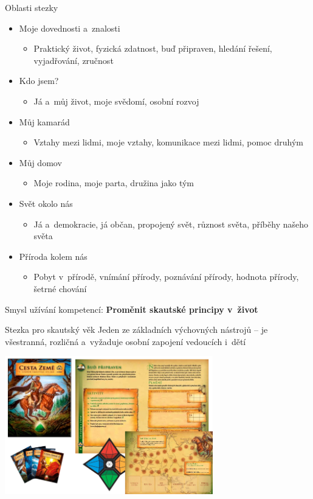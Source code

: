 \documentclass[compress,xelatex,xcolor=dvipsnames,print]{beamer}
\begin{document}
\begin{frame}{Oblasti stezky}
\begin{itemize}
\item Moje dovednosti a~znalosti
 \begin{itemize}
 \item Praktický život, fyzická zdatnost, buď připraven, hledání řešení, vyjadřování, zručnost
 \end{itemize}
\item Kdo jsem?
 \begin{itemize}
 \item Já a~můj život, moje svědomí, osobní rozvoj
 \end{itemize}
\item Můj kamarád
 \begin{itemize}
 \item Vztahy mezi lidmi, moje vztahy, komunikace mezi lidmi, pomoc druhým
 \end{itemize}
\item Můj domov
 \begin{itemize}
 \item Moje rodina, moje parta, družina jako tým
 \end{itemize}
\item Svět okolo nás
 \begin{itemize}
 \item Já a~demokracie, já občan, propojený svět, různost světa, příběhy našeho světa
 \end{itemize}
\item Příroda kolem nás
 \begin{itemize}
 \item Pobyt v~přírodě, vnímání přírody, poznávání přírody, hodnota přírody, šetrné chování
 \end{itemize}
\end{itemize}
Smysl užívání kompetencí: \textbf{Proměnit skautské principy v~život}
\end{frame}

\begin{frame}{Stezka pro skautský věk}
Jeden ze základních výchovných nástrojů -- je všestranná, rozličná a~vyžaduje osobní zapojení vedoucích i~dětí
\begin{center}
\includegraphics[height=6cm]{stezka.png}
\end{center}
\end{frame}
\end{document}
